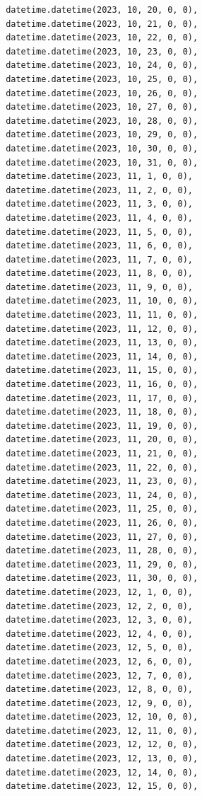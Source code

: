 \documentclass[
  letterpaper,
  DIV=11,
  numbers=noendperiod,
  oneside]{scrreprt}
\begin{document}
\begin{verbatim}
       datetime.datetime(2023, 10, 20, 0, 0),
       datetime.datetime(2023, 10, 21, 0, 0),
       datetime.datetime(2023, 10, 22, 0, 0),
       datetime.datetime(2023, 10, 23, 0, 0),
       datetime.datetime(2023, 10, 24, 0, 0),
       datetime.datetime(2023, 10, 25, 0, 0),
       datetime.datetime(2023, 10, 26, 0, 0),
       datetime.datetime(2023, 10, 27, 0, 0),
       datetime.datetime(2023, 10, 28, 0, 0),
       datetime.datetime(2023, 10, 29, 0, 0),
       datetime.datetime(2023, 10, 30, 0, 0),
       datetime.datetime(2023, 10, 31, 0, 0),
       datetime.datetime(2023, 11, 1, 0, 0),
       datetime.datetime(2023, 11, 2, 0, 0),
       datetime.datetime(2023, 11, 3, 0, 0),
       datetime.datetime(2023, 11, 4, 0, 0),
       datetime.datetime(2023, 11, 5, 0, 0),
       datetime.datetime(2023, 11, 6, 0, 0),
       datetime.datetime(2023, 11, 7, 0, 0),
       datetime.datetime(2023, 11, 8, 0, 0),
       datetime.datetime(2023, 11, 9, 0, 0),
       datetime.datetime(2023, 11, 10, 0, 0),
       datetime.datetime(2023, 11, 11, 0, 0),
       datetime.datetime(2023, 11, 12, 0, 0),
       datetime.datetime(2023, 11, 13, 0, 0),
       datetime.datetime(2023, 11, 14, 0, 0),
       datetime.datetime(2023, 11, 15, 0, 0),
       datetime.datetime(2023, 11, 16, 0, 0),
       datetime.datetime(2023, 11, 17, 0, 0),
       datetime.datetime(2023, 11, 18, 0, 0),
       datetime.datetime(2023, 11, 19, 0, 0),
       datetime.datetime(2023, 11, 20, 0, 0),
       datetime.datetime(2023, 11, 21, 0, 0),
       datetime.datetime(2023, 11, 22, 0, 0),
       datetime.datetime(2023, 11, 23, 0, 0),
       datetime.datetime(2023, 11, 24, 0, 0),
       datetime.datetime(2023, 11, 25, 0, 0),
       datetime.datetime(2023, 11, 26, 0, 0),
       datetime.datetime(2023, 11, 27, 0, 0),
       datetime.datetime(2023, 11, 28, 0, 0),
       datetime.datetime(2023, 11, 29, 0, 0),
       datetime.datetime(2023, 11, 30, 0, 0),
       datetime.datetime(2023, 12, 1, 0, 0),
       datetime.datetime(2023, 12, 2, 0, 0),
       datetime.datetime(2023, 12, 3, 0, 0),
       datetime.datetime(2023, 12, 4, 0, 0),
       datetime.datetime(2023, 12, 5, 0, 0),
       datetime.datetime(2023, 12, 6, 0, 0),
       datetime.datetime(2023, 12, 7, 0, 0),
       datetime.datetime(2023, 12, 8, 0, 0),
       datetime.datetime(2023, 12, 9, 0, 0),
       datetime.datetime(2023, 12, 10, 0, 0),
       datetime.datetime(2023, 12, 11, 0, 0),
       datetime.datetime(2023, 12, 12, 0, 0),
       datetime.datetime(2023, 12, 13, 0, 0),
       datetime.datetime(2023, 12, 14, 0, 0),
       datetime.datetime(2023, 12, 15, 0, 0),

\end{verbatim}
\end{document}
